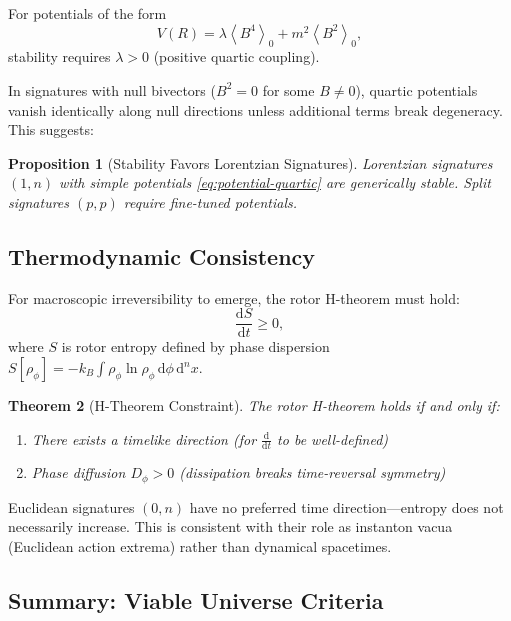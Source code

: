 \documentclass[11pt,a4paper]{article}
\numberwithin{equation}{section}
\theoremstyle{plain}
\newtheorem{theorem}{Theorem}[section]
\newtheorem{proposition}[theorem]{Proposition}
\theoremstyle{definition}
\theoremstyle{remark}
\newcommand{\grade}[2]{\left\langle #1 \right\rangle_{#2}}
\newcommand{\scal}[1]{\grade{#1}{0}}       %
\renewcommand{\dd}{\mathrm{d}}
\begin{document}
For potentials of the form
\begin{equation}
V(R) = \lambda \scal{B^4} + m^2 \scal{B^2},
\label{eq:potential-quartic}
\end{equation}
stability requires $\lambda > 0$ (positive quartic coupling).

In signatures with null bivectors ($B^2 = 0$ for some $B \neq 0$), quartic potentials vanish identically along null directions unless additional terms break degeneracy. This suggests:

\begin{proposition}[Stability Favors Lorentzian Signatures]
Lorentzian signatures $(1,n)$ with simple potentials \eqref{eq:potential-quartic} are generically stable. Split signatures $(p,p)$ require fine-tuned potentials.
\end{proposition}

\subsection{Thermodynamic Consistency}

For macroscopic irreversibility to emerge, the rotor H-theorem must hold:
\begin{equation}
\frac{\dd S}{\dd t} \geq 0,
\end{equation}
where $S$ is rotor entropy defined by phase dispersion $S[\rho_\phi] = -k_B \int \rho_\phi \ln \rho_\phi \, \dd\phi \, \dd^n x$.

\begin{theorem}[H-Theorem Constraint]
The rotor H-theorem holds if and only if:
\begin{enumerate}
\item There exists a timelike direction (for $\frac{\dd}{\dd t}$ to be well-defined)
\item Phase diffusion $D_\phi > 0$ (dissipation breaks time-reversal symmetry)
\end{enumerate}
\end{theorem}

Euclidean signatures $(0,n)$ have no preferred time direction—entropy does not necessarily increase. This is consistent with their role as instanton vacua (Euclidean action extrema) rather than dynamical spacetimes.

\subsection{Summary: Viable Universe Criteria}
\end{document}

